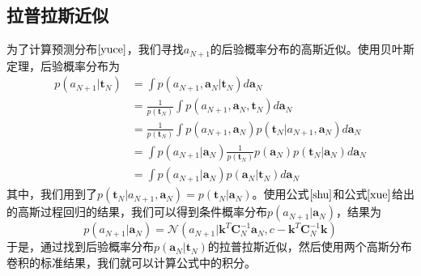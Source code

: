 \subsection*{拉普拉斯近似}
为了计算预测分布$\ref{yuce}$，我们寻找$a_{N+1}$的后验概率分布的高斯近似。使用贝叶斯定理，后验概率分布为
\begin{equation}
	\begin{aligned}
	\label{he}
	p(a_{N+1}|\boldsymbol{t}_N)&=\int p(a_{N+1},\boldsymbol{a}_N|\boldsymbol{t}_N)d\boldsymbol{a}_N\\\
	&=\frac{1}{p(\boldsymbol{t}_N)}\int p(a_{N+1},\boldsymbol{a}_N,\boldsymbol{t}_N)d\boldsymbol{a}_N \\
	&=\frac{1}{p(\boldsymbol{t}_N)}\int p(a_{N+1},\boldsymbol{a}_N)p(\boldsymbol{t}_N|a_{N+1},\boldsymbol{a}_N)d\boldsymbol{a}_N \\
	&=\int p(a_{N+1}|\boldsymbol{a}_N)\frac{1}{p(\boldsymbol{t}_N)}p(\boldsymbol{a}_N)p(\boldsymbol{t}_N|\boldsymbol{a}_N)d\boldsymbol{a}_N \\
	&=\int p(a_{N+1}|\boldsymbol{a}_N)p(\boldsymbol{a}_N|\boldsymbol{t}_N)d\boldsymbol{a}_N
	\end{aligned}
\end{equation}
其中，我们用到了$p(\boldsymbol{t}_N|a_{N+1},\boldsymbol{a}_N)=p(\boldsymbol{t}_N|\boldsymbol{a}_N)$。使用公式$\ref{shu}$和公式$\ref{xue}$给出的高斯过程回归的结果，我们可以得到条件概率分布$p(a_{N+1}|\boldsymbol{a}_N)$，结果为
\begin{equation}
\label{jie}
	p(a_{N+1}|\boldsymbol{a}_N)=\mathcal{N}(a_{N+1}|\boldsymbol{k}^T\boldsymbol{C}_N^{-1}\boldsymbol{a}_N,c-\boldsymbol{k}^T\boldsymbol{C}_N^{-1}\boldsymbol{k})
\end{equation}
于是，通过找到后验概率分布$p(\boldsymbol{a}_N|\boldsymbol{t}_N)$的拉普拉斯近似，然后使用两个高斯分布卷积的标准结果，我们就可以计算公式中的积分。

